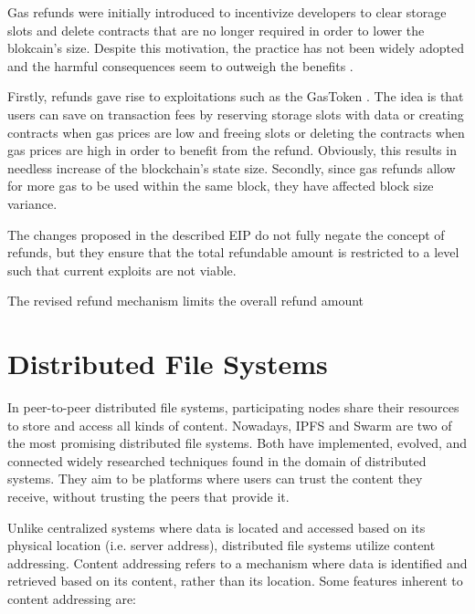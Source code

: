 Gas refunds were initially introduced to incentivize developers to clear storage slots and delete contracts that are no longer required in order to lower the blokcain's size. Despite this motivation, the practice has not been widely adopted and the harmful consequences seem to outweigh the benefits \citep{buterin_eip_3529}.

Firstly, refunds gave rise to exploitations such as the GasToken \citep{gastokenproject_2018}. The idea is that users can save on transaction fees by reserving storage slots with data or creating contracts when gas prices are low and freeing slots or deleting the contracts when gas prices are high in order to benefit from the refund. Obviously, this results in needless increase of the blockchain's state size. Secondly, since gas refunds allow for more gas to be used within the same block, they have affected block size variance.

The changes proposed in the described EIP do not fully negate the concept of refunds, but they ensure that the total refundable amount is restricted to a level such that current exploits are not viable.

The revised refund mechanism limits the overall refund amount
\section{Distributed File Systems}\label{sec:dfs}
In peer-to-peer distributed file systems, participating nodes share their resources to store and access all kinds of content. Nowadays, IPFS and Swarm are two of the most promising distributed file systems. Both have implemented, evolved, and connected widely researched techniques found in the domain of distributed systems. They aim to be platforms where users can trust the content they receive, without trusting the peers that provide it.

Unlike centralized systems where data is located and accessed based on its physical location (i.e. server address), distributed file systems utilize content addressing. Content addressing \citep{trautwein_2022} refers to a mechanism where data is identified and retrieved based on its content, rather than its location. Some features inherent to content addressing are:

